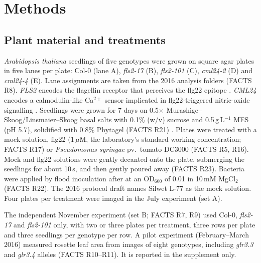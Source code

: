 
\section{Methods}

\subsection{Plant material and treatments}
\textit{Arabidopsis thaliana} seedlings of five genotypes were grown on square agar plates in
five lanes per plate: Col-0 (lane A), \textit{fls2-17} (B), \textit{fls2-101} (C),
\textit{cml24-2} (D) and \textit{cml24-4} (E). Lane assignments are taken from the 2016 analysis
folders (FACTS R8). 
\textit{FLS2} encodes the flagellin receptor that perceives the flg22 epitope
\citep{gomezgomez1999,felix1999,gomezgomez2000,chinchilla2006}. \textit{CML24} encodes a
calmodulin-like Ca$^{2+}$ sensor \citep{delk2005} implicated in flg22-triggered nitric-oxide
signalling \citep{ma2008}.
Seedlings were grown for 7 days on 0.5$\times$ Murashige--Skoog/Linsmaier--Skoog basal salts with
0.1\% (w/v) sucrose and 0.5\,g\,L$^{-1}$ MES (pH 5.7), solidified with 0.8\% Phytagel (FACTS R21)
.
Plates were treated with a mock solution, flg22 (1\,$\mu$M, the laboratory's standard working
concentration; FACTS R17) or \textit{Pseudomonas syringae} pv.\ tomato DC3000 (FACTS R5, R16).
Mock and flg22 solutions were gently decanted onto the plate, submerging the seedlings for about
10\,s, and then gently poured away (FACTS R23). Bacteria were applied by flood inoculation after \citet{ishiga2011} at an OD$_{600}$ of 0.01 in
10\,mM MgCl$_2$ (FACTS R22). The 2016 protocol draft names Silwet L-77 as the mock solution. Four plates per treatment were imaged in the July experiment (set A).

The independent November experiment (set B; FACTS R7, R9) used Col-0, \textit{fls2-17} and
\textit{fls2-101} only, with two or three plates per treatment, three rows per plate and three
seedlings per genotype per row. A pilot experiment (February--March 2016) measured rosette leaf
area from images of eight genotypes, including \textit{glr3.3} and \textit{glr3.4} alleles
(FACTS R10--R11). It is reported in the supplement only.

